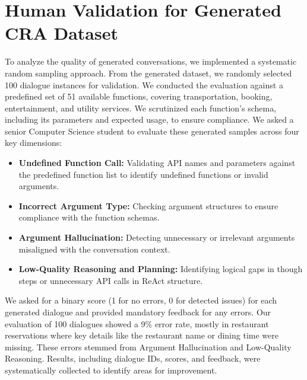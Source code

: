 \section{Human Validation for Generated CRA Dataset}
\label{human-validation}
To analyze the quality of generated conversations, we implemented a systematic random sampling approach. From the generated dataset, we randomly selected 100 dialogue instances for validation. We conducted the evaluation against a predefined set of 51 available functions, covering transportation, booking, entertainment, and utility services. We scrutinized each function’s schema, including its parameters and expected usage, to ensure compliance. We asked a senior Computer Science student to evaluate these generated samples across four key dimensions:
\begin{itemize}
    \item \textbf{Undefined Function Call:} Validating API names and parameters against the predefined function list to identify undefined functions or invalid arguments.
    \item \textbf{Incorrect Argument Type:} Checking argument structures to ensure compliance with the function schemas.
    \item \textbf{Argument Hallucination:} Detecting unnecessary or irrelevant arguments misaligned with the conversation context.
    \item \textbf{Low-Quality Reasoning and Planning:} Identifying logical gaps in though steps or unnecessary API calls in ReAct structure.
\end{itemize}
We asked for a binary score (1 for no errors, 0 for detected issues) for each generated dialogue and provided mandatory feedback for any errors. Our evaluation of 100 dialogues showed a 9\% error rate, mostly in restaurant reservations where key details like the restaurant name or dining time were missing. These errors stemmed from Argument Hallucination and Low-Quality Reasoning. Results, including dialogue IDs, scores, and feedback, were systematically collected to identify areas for improvement.






